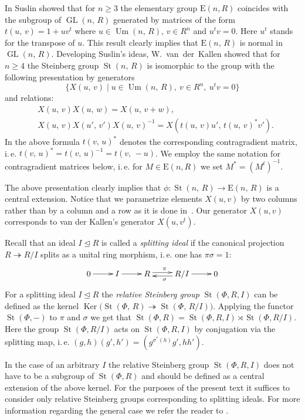 \documentclass[11pt]{amsart}
\theoremstyle{plain} \declaretheorem[name=Theorem, Refname={Theorem,Theorems}]{tm} \Crefname{tm}{Theorem}{Theorems}
\numberwithin{equation}{section}
\theoremstyle{definition} \newtheorem{df}[lm]{Definition} \Crefname{df}{Definition}{Definitions}
\theoremstyle{remark} \newtheorem{rk}[lm]{Remark} \Crefname{rk}{Remark}{Remarks}
\newcommand{\Ker}{\mathop{\mathrm{Ker}}\nolimits}
\newcommand{\E}{{\mathrm{E}}}
\newcommand{\Um}{\mathop{\mathrm{Um}}\nolimits}
\newcommand{\St}{\mathop{\mathrm{St}}\nolimits}
\newcommand{\GL}{\mathop{\mathrm{GL}}\nolimits}
\newcommand{\epi}{\twoheadrightarrow}
\newcommand{\inv}{^{-1}}
\begin{document}
In \cite{Sus} Suslin showed that for $n\geq 3$ the elementary group $\E(n, R)$ coincides with the subgroup of $\GL(n,\,R)$ generated by matrices
of the form $t(u,\,v)=1+uv^t$ where $u\in\Um(n,\,R)$, $v\in R^n$ and $u^tv=0$. Here $u^t$ stands for the transpose of $u$.
This result clearly implies that $\E(n,\,R)$ is normal in $\GL(n,\,R)$.
Developing Suslin's ideas, W.~van~der~Kallen showed that for $n\geq4$ the Steinberg group $\St(n,\,R)$ is isomorphic to the group with the following presentation by generators
$$\{X(u,\,v)\mid u\in\Um(n,\,R),\ v\in R^n,\ u^tv=0\}$$ and relations:
\setcounter{equation}{0} \renewcommand{\theequation}{K\arabic{equation}}
\begin{align}
&X(u,\,v)X(u,\,w)=X(u,\,v+w), \label{add1} \\
&X(u,\,v)X(u',\,v')X(u,\,v)\inv=X(t(u,\,v)u',\,t(u,\,v)^* v'). \label{conj1}
\end{align}
In the above formula $t(v,\,u)^*$ denotes the corresponding contragradient matrix, i.\,e. $t(v,\,u)^* = t(v,\,u)\inv = t(v,\,-u)$.
We employ the same notation for contragradient matrices below, i.\,e. for $M\in\E(n,R)$ we set $M^* = (M^t)\inv$.

The above presentation clearly implies that $\phi\colon\St(n,\,R)\rightarrow\E(n,\,R)$ is a central extension.
Notice that we parametrize elements $X(u, v)$ by two columns rather than by a column and a row as it is done in~\cite{vdK}.
Our generator $X(u,v)$ corresponds to van der Kallen's generator $X(u, v^t)$.

Recall that an ideal $I\trianglelefteq R$ is called a \emph{splitting ideal} if the canonical projection $R \twoheadrightarrow R/I$ splits as a unital ring morphism, i.\,e. one has $\pi\sigma=1$:
$$\xymatrix{0\ar@<0.1ex>[r]^{}&I\ar@<0.1ex>[r]^{}&R\ar@<0.5ex>[r]^{\pi}&R/I\ar@<0.5ex>[l]^{\sigma}\ar@<0.1ex>[r]^{}&0}$$
For a splitting ideal $I\trianglelefteq R$ the \emph{relative Steinberg group} $\St(\Phi, R, I)$ can be defined as the kernel $\Ker\big(\St(\Phi,\,R)\epi\St(\Phi,\,R/I)\big)$.
Applying the functor $\St(\Phi, -)$ to $\pi$ and $\sigma$ we get that $\St(\Phi, R) = \St(\Phi, R, I) \rtimes \St(\Phi, R/I)$.
Here the group $\St(\Phi, R/I)$ acts on $\St(\Phi, R, I)$ by conjugation via the splitting map, i.\,e. $(g, h) (g',h') = (g {}^{\sigma^*(h)}g', hh')$.

In the case of an arbitrary $I$ the relative Steinberg group $\St(\Phi, R, I)$ does not have to be a subgroup of $\St(\Phi, R)$ and should be defined as a central extension of the above kernel.
For the purposes of the present text it suffices to consider only relative Steinberg groups corresponding to splitting ideals.
For more information regarding the general case we refer the reader to \cite[Section~3]{SCh}.
\end{document}

